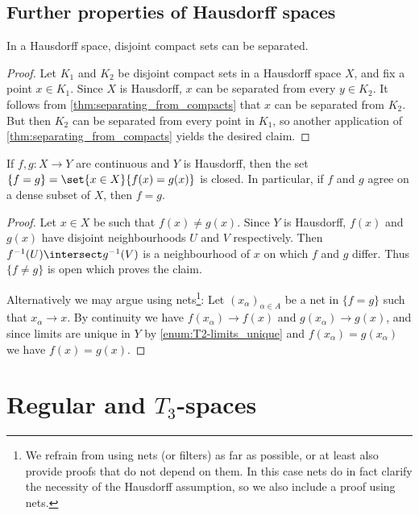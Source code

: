 \documentclass[article, a4paper, 11pt, oneside]{memoir}
\numberwithin{equation}{chapter}
\newcommand{\preim}{^{-1}}
\begin{document}
\section{Further properties of Hausdorff spaces}

\begin{proposition}
    \label{thm:Hausdorff-separate-compacts}
    In a Hausdorff space, disjoint compact sets can be separated.
\end{proposition}

\begin{proof}
    Let $K_1$ and $K_2$ be disjoint compact sets in a Hausdorff space $X$, and fix a point $x \in K_1$. Since $X$ is Hausdorff, $x$ can be separated from every $y \in K_2$. It follows from \cref{thm:separating_from_compacts} that $x$ can be separated from $K_2$. But then $K_2$ can be separated from every point in $K_1$, so another application of \cref{thm:separating_from_compacts} yields the desired claim.
\end{proof}


\begin{proposition}
    If $f,g \colon X \to Y$ are continuous and $Y$ is Hausdorff, then the set $\{f = g\} = \set{x \in X}{f(x) = g(x)}$ is closed. In particular, if $f$ and $g$ agree on a dense subset of $X$, then $f = g$.
\end{proposition}

\begin{proof}
    Let $x \in X$ be such that $f(x) \neq g(x)$. Since $Y$ is Hausdorff, $f(x)$ and $g(x)$ have disjoint neighbourhoods $U$ and $V$ respectively. Then $f\preim(U) \intersect g\preim(V)$ is a neighbourhood of $x$ on which $f$ and $g$ differ. Thus $\{f \neq g\}$ is open which proves the claim.

    Alternatively we may argue using nets\footnote{We refrain from using nets (or filters) as far as possible, or at least also provide proofs that do not depend on them. In this case nets do in fact clarify the necessity of the Hausdorff assumption, so we also include a proof using nets.}: Let $(x_\alpha)_{\alpha \in A}$ be a net in $\{f = g\}$ such that $x_\alpha \to x$. By continuity we have $f(x_\alpha) \to f(x)$ and $g(x_\alpha) \to g(x)$, and since limits are unique in $Y$ by \cref{enum:T2-limits_unique} and $f(x_\alpha) = g(x_\alpha)$ we have $f(x) = g(x)$.
\end{proof}



\chapter[Regular and T3-spaces][Regular and $T_3$-spaces]{Regular and $T_3$-spaces}
\end{document}
